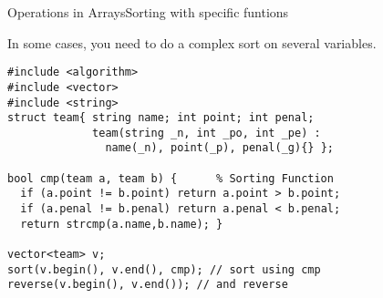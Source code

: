 \begin{frame}[fragile]{Operations in Arrays}{Sorting with specific funtions}
{\small
  In some cases, you need to do a complex sort on several variables.
  \begin{block}{}
\begin{verbatim}
#include <algorithm>
#include <vector>
#include <string>
struct team{ string name; int point; int penal;
             team(string _n, int _po, int _pe) :
               name(_n), point(_p), penal(_g){} };

bool cmp(team a, team b) {      % Sorting Function
  if (a.point != b.point) return a.point > b.point;
  if (a.penal != b.penal) return a.penal < b.penal;
  return strcmp(a.name,b.name); }

vector<team> v;
sort(v.begin(), v.end(), cmp); // sort using cmp
reverse(v.begin(), v.end()); // and reverse
\end{verbatim}
\end{block}}
\end{frame}
